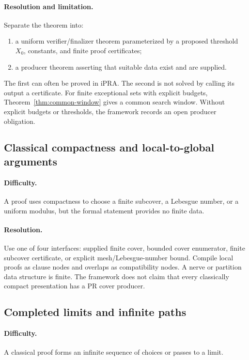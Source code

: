 \paragraph{Resolution and limitation.}
Separate the theorem into:

\begin{enumerate}
\item a uniform verifier/finalizer theorem parameterized by a proposed threshold
\(X_0\), constants, and finite proof certificates;
\item a producer theorem asserting that suitable data exist and are supplied.
\end{enumerate}

The first can often be proved in iPRA.  The second is not solved by calling its
output a certificate.  For finite exceptional sets with explicit budgets,
Theorem~\ref{thm:common-window} gives a common search window.  Without explicit
budgets or thresholds, the framework records an open producer obligation.

\subsection{Classical compactness and local-to-global arguments}

\paragraph{Difficulty.}
A proof uses compactness to choose a finite subcover, a Lebesgue number, or a
uniform modulus, but the formal statement provides no finite data.

\paragraph{Resolution.}
Use one of four interfaces: supplied finite cover, bounded cover enumerator,
finite subcover certificate, or explicit mesh/Lebesgue-number bound.  Compile
local proofs as clause nodes and overlaps as compatibility nodes.  A nerve or
partition data structure is finite.  The framework does not claim that every
classically compact presentation has a PR cover producer.

\subsection{Completed limits and infinite paths}

\paragraph{Difficulty.}
A classical proof forms an infinite sequence of choices or passes to a limit.

